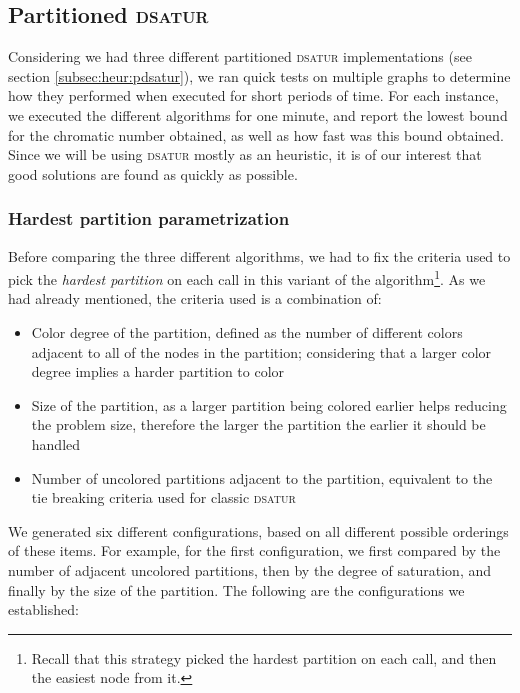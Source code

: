 
\subsection{Partitioned \textsc{dsatur}}
\label{subsec:resultspdsatur}

Considering we had three different partitioned \textsc{dsatur} implementations (see section \ref{subsec:heur:pdsatur}), we ran quick tests on multiple graphs to determine how they performed when executed for short periods of time. For each instance, we executed the different algorithms for one minute, and report the lowest bound for the chromatic number obtained, as well as how fast was this bound obtained. Since we will be using \textsc{dsatur} mostly as an heuristic, it is of our interest that good solutions are found as quickly as possible.

\subsubsection*{Hardest partition parametrization}

Before comparing the three different algorithms, we had to fix the criteria used to pick the \textit{hardest partition} on each call in this variant of the algorithm\footnote{Recall that this strategy picked the hardest partition on each call, and then the easiest node from it.}. As we had already mentioned, the criteria used is a combination of:

\begin{itemize}
	\item{Color degree of the partition, defined as the number of different colors adjacent to all of the nodes in the partition; considering that a larger color degree implies a harder partition to color}
	\item{Size of the partition, as a larger partition being colored earlier helps reducing the problem size, therefore the larger the partition the earlier it should be handled}
	\item{Number of uncolored partitions adjacent to the partition, equivalent to the tie breaking criteria used for classic \textsc{dsatur}} 
\end{itemize}

We generated six different configurations, based on all different possible orderings of these items. For example, for the first configuration, we first compared by the number of adjacent uncolored partitions, then by the degree of saturation, and finally by the size of the partition. The following are the configurations we established:

